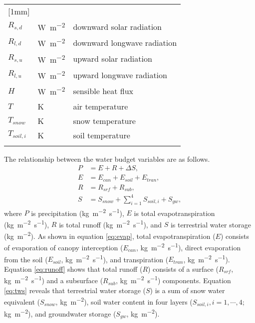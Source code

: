 \documentclass[essd]{copernicus}
\begin{document}
\begin{table}[t]
\begin{tabular}{lll}
        [1mm]
        \multicolumn{3}{c}{surface energy budget}                                    \\
        $R_{s,d}$    & \unit{W~m^{-2}}         & downward solar radiation            \\
        $R_{l,d}$    & \unit{W~m^{-2}}         & downward longwave radiation         \\
        $R_{s,u}$    & \unit{W~m^{-2}}         & upward solar radiation              \\
        $R_{l,u}$    & \unit{W~m^{-2}}         & upward longwave radiation           \\
        $H$          & \unit{W~m^{-2}}         & sensible heat flux                  \\
        $T$          & \unit{K}                & air temperature                     \\
        $T_{snow}$   & \unit{K}                & snow temperature                    \\
        $T_{soil,i}$ & \unit{K}                & soil temperature                    \\
        \bottomhline
    \end{tabular}
\end{table}

The relationship between the water budget variables are as follows.
\begin{align}
    P & = E + R + \Delta S \label{eq:watbal},                          \\
    E & = E_{can} + E_{soil} + E_{tran} \label{eq:evap},               \\
    R & = R_{srf} + R_{sub} \label{eq:runoff},                         \\
    S & = S_{snow} + \sum_{i=1}^{4}S_{soil,i} + S_{gw} \label{eq:tws},
\end{align}
where $P$ is precipitation (\unit{kg~m^{-2}~s^{-1}}), $E$ is total evapotranspiration (\unit{kg~m^{-2}~s^{-1}}), $R$ is total runoff (\unit{kg~m^{-2}~s^{-1}}), and $S$ is terrestrial water storage (\unit{kg~m^{-2}}). As shown in equation \eqref{eq:evap}, total evapotranspiration ($E$) consists of evaporation of canopy interception ($E_{can}$, \unit{kg~m^{-2}~s^{-1}}), direct evaporation from the soil ($E_{soil}$, \unit{kg~m^{-2}~s^{-1}}), and transpiration ($E_{tran}$, \unit{kg~m^{-2}~s^{-1}}). Equation \eqref{eq:runoff} shows that total runoff ($R$) consists of a surface ($R_{srf}$, \unit{kg~m^{-2}~s^{-1}}) and a subsurface ($R_{sub}$, \unit{kg~m^{-2}~s^{-1}}) components. Equation \eqref{eq:tws} reveals that terrestrial water storage ($S$) is a sum of snow water equivalent ($S_{snow}$, \unit{kg~m^{-2}}), soil water content in four layers ($S_{soil,i}, i=1,\cdots,4$; \unit{kg~m^{-2}}), and groundwater storage ($S_{gw}$, \unit{kg~m^{-2}}).
\end{document}
